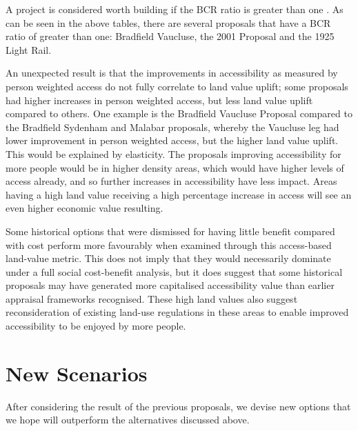 \documentclass[preprint,12pt,authoryear]{elsarticle}
\begin{document}
A project is considered worth building if the BCR ratio is greater than one \parencite{atap2024}. As can be seen in the above tables, there are several proposals that have a BCR ratio of greater than one: Bradfield Vaucluse, the 2001 Proposal and the 1925 Light Rail.  




An unexpected result is that the improvements in accessibility as measured by person weighted access do not fully correlate to land value uplift; some proposals had higher increases in person weighted access, but less land value uplift compared to others. One example is the Bradfield Vaucluse Proposal compared to the Bradfield Sydenham and Malabar proposals, whereby the Vaucluse leg had lower improvement in person weighted access, but the higher land value uplift. This would be explained by elasticity. The proposals improving accessibility for more people would be in higher density areas, which would have higher levels of access already, and so further increases in accessibility have less impact. Areas having a high land value receiving a high percentage increase in access will see an even higher economic value resulting.


{Some historical options that were dismissed for having little benefit compared with cost perform more favourably when examined through this access-based land-value metric. This does not imply that they would necessarily dominate under a full social cost-benefit analysis, but it does suggest that some historical proposals may have generated more capitalised accessibility value than earlier appraisal frameworks recognised. These high land values also suggest reconsideration of existing land-use regulations in these areas to enable improved accessibility to be enjoyed by more people.}

\section{New Scenarios}
\label{sec:newscenarios}

After considering the result of the previous proposals, we  devise new options that we hope will outperform the alternatives discussed above. 
\end{document}
